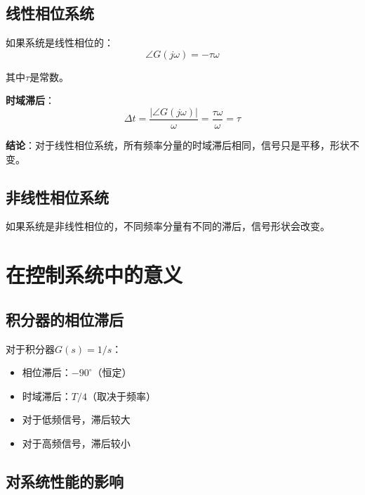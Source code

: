 \documentclass[12pt,a4paper]{article}
\begin{document}
\subsection{线性相位系统}

如果系统是线性相位的：
\begin{equation}
\angle G(j\omega) = -\tau \omega
\end{equation}

其中$\tau$是常数。

\textbf{时域滞后}：
\begin{equation}
\Delta t = \frac{|\angle G(j\omega)|}{\omega} = \frac{\tau \omega}{\omega} = \tau
\end{equation}

\textbf{结论}：对于线性相位系统，所有频率分量的时域滞后相同，信号只是平移，形状不变。

\subsection{非线性相位系统}

如果系统是非线性相位的，不同频率分量有不同的滞后，信号形状会改变。

\section{在控制系统中的意义}

\subsection{积分器的相位滞后}

对于积分器$G(s) = 1/s$：
\begin{itemize}
\item 相位滞后：$-90^\circ$（恒定）
\item 时域滞后：$T/4$（取决于频率）
\item 对于低频信号，滞后较大
\item 对于高频信号，滞后较小
\end{itemize}

\subsection{对系统性能的影响}
\end{document}
